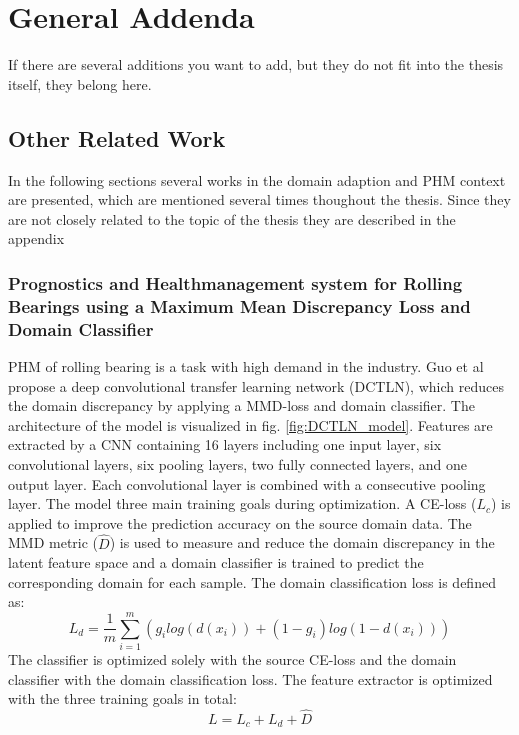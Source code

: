 \chapter{General Addenda}

If there are several additions you want to add, but they do not fit into the thesis itself, they belong here.
\section{Other Related Work}
In the following sections several works in the domain adaption and PHM context are presented, which are mentioned several times thoughout the thesis. Since they are not closely related to the topic of the thesis they are described in the appendix

\subsection{Prognostics and Healthmanagement system for Rolling Bearings using a Maximum Mean Discrepancy Loss and Domain Classifier}
PHM of rolling bearing is a task with high demand in the industry. Guo et al \cite{Guo2019} propose a deep convolutional transfer learning network (DCTLN), which reduces the domain discrepancy by applying a MMD-loss and domain classifier. The architecture of the model is visualized in fig. \ref{fig:DCTLN_model}. Features are extracted by a CNN containing 16 layers including one input layer, six convolutional layers, six pooling layers, two fully connected layers, and one output layer. Each convolutional layer is combined with a consecutive pooling layer. The model three main training goals during optimization. A CE-loss ($L_{c}$) is applied to improve the prediction accuracy on the source domain data. The MMD metric ($\hat{D}$) is used to measure and reduce the domain discrepancy in the latent feature space and a domain classifier is trained to predict the corresponding domain for each sample. The  domain classification loss is defined as:
\begin{equation}
    L_{d} = \frac{1}{m} \sum_{i=1}^{m} (g_{i} log(d(x_{i})) + (1-g_{i}) log(1-d(x_{i})))
\end{equation}
The classifier is optimized solely with the source CE-loss and the domain classifier with the domain classification loss. The feature extractor is optimized with the three training goals in total:
\begin{equation}
    L = L_{c} + L_{d} + \hat{D}
\end{equation}

